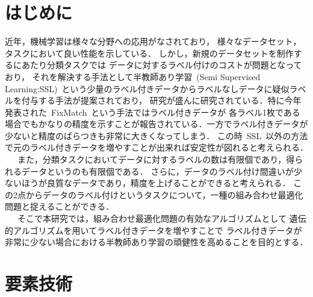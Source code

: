 \documentclass[twocolumn]{jarticle}     %
\begin{document}

\section{はじめに}
近年，機械学習は様々な分野への応用がなされており，
様々なデータセット，タスクにおいて良い性能を示している．
しかし，新規のデータセットを制作するにあたり分類タスクでは
データに対するラベル付けのコストが問題となっており，
それを解決する手法として半教師あり学習\ (Semi Supervised Learning:SSL)\ という少量のラベル付きデータからラベルなしデータに疑似ラベルを付与する手法が提案されており，
研究が盛んに研究されている．特に今年発表された\ FixMatch\cite{sohn2020fixmatch}\ という手法ではラベル付きデータが
各ラベル1枚である場合でもかなりの精度を示すことが報告されている．一方でラベル付きデータが少ないと精度のばらつきも非常に大きくなってしまう．
この時\ SSL\ 以外の方法で元のラベル付きデータを増やすことが出来れば安定性が図れると考えられる．\\
\ \ \ また，分類タスクにおいてデータに対するラベルの数は有限個であり，得られるデータというのも有限個である．
さらに，データのラベル付け間違いが少ないほうが良質なデータであり，精度を上げることができると考えられる．
この2点からデータのラベル付けというタスクについて，一種の組み合わせ最適化問題と捉えることができる．\\
\ \ \ そこで本研究では，組み合わせ最適化問題の有効なアルゴリズムとして
遺伝的アルゴリズムを用いてラベル付きデータを増やすことで
ラベル付きデータが非常に少ない場合における半教師あり学習の頑健性を高めることを目的とする．

\section{要素技術}
\end{document}
